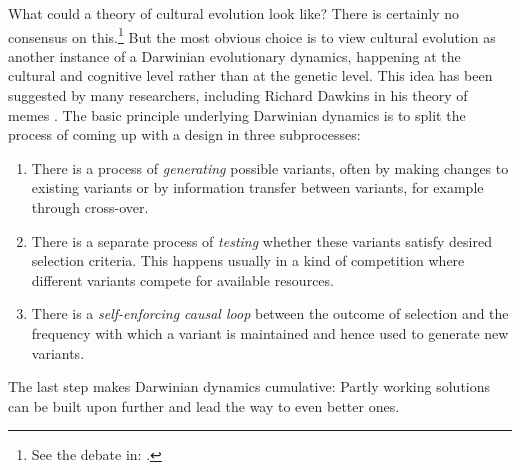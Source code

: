 What could a theory of cultural evolution look like? There is certainly no 
consensus on this.\footnote{See the debate in: \cite{Richerson:2005}.}
But the most obvious choice is to view cultural evolution as another instance of a Darwinian evolutionary dynamics, happening at 
the cultural and cognitive level rather than at the genetic level. This idea has been suggested by many researchers, 
including Richard Dawkins in his theory of memes \citep{Dawkins:1976}. 
The basic principle underlying Darwinian dynamics 
is to split the process of coming up with a design in three subprocesses: 
\begin{enumerate}
\item There is a process of {\itshape generating} possible variants, often by making changes to 
existing variants or by information transfer between variants, for example through cross-over. 
\item There is a separate process of {\itshape testing} whether these variants satisfy 
desired selection criteria. This happens usually in a kind of competition where different variants 
compete for available resources. 
\item There is a {\itshape self-enforcing causal loop} between the 
outcome of selection and the frequency with which a variant is maintained and hence used to generate new 
variants. 
\end{enumerate}
The last step makes Darwinian dynamics cumulative: Partly working solutions can be built upon further and lead 
the way to even better ones. 

